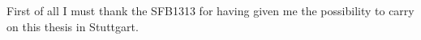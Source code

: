 First of all I must thank the SFB1313 for having given me the possibility to 
carry on this thesis in Stuttgart.